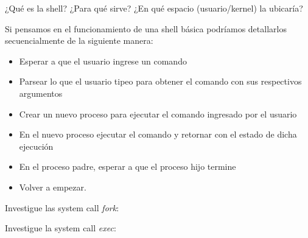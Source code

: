 \begin{questions}
\question ¿Qué es la shell? ¿Para qué sirve?
\question ¿En qué espacio (usuario/kernel) la ubicaría?

\question Si pensamos en el funcionamiento de una shell básica podríamos
detallarlos secuencialmente de la siguiente manera:
\begin{itemize}
\item Esperar a que el usuario ingrese un comando
\item Parsear lo que el usuario tipeo para obtener el comando con sus respectivos argumentos
\item Crear un nuevo proceso para ejecutar el comando ingresado por el usuario
\item En el nuevo proceso ejecutar el comando y retornar con el estado de dicha ejecución
\item En el proceso padre, esperar a que el proceso hijo termine
\item Volver a empezar.
\end{itemize}

\question Investigue las system call \textit{fork}:

\question Investigue la system call \textit{exec}:
\end{questions}

